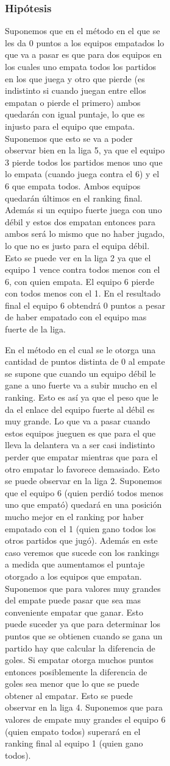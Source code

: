 \begin{figure}[h]
\begin{figure}[h]
\begin{figure}[h]
            \subsubsection*{Hipótesis}
            Suponemos que en el método en el que se les da 0 puntos a los equipos empatados lo que va a pasar es que para dos equipos en los cuales uno empata todos los partidos en los que juega y otro que pierde (es indistinto si cuando juegan entre ellos empatan o pierde el primero) ambos quedarán con igual puntaje, lo que es injusto para el equipo que empata. Suponemos que esto se va a poder observar bien en la liga 5, ya que el equipo 3 pierde todos los partidos menos uno que lo empata (cuando juega contra el 6) y el 6 que empata todos. Ambos equipos quedarán últimos en el ranking final. Además si un equipo fuerte juega con uno débil y estos dos empatan entonces para ambos será lo mismo que no haber jugado, lo que no es justo para el equipa débil. Esto se puede ver en la liga 2 ya que el equipo 1 vence contra todos menos con el 6, con quien empata. El equipo 6 pierde con todos menos con el 1. En el resultado final el equipo 6 obtendrá 0 puntos a pesar de haber empatado con el equipo mas fuerte de la liga.

            En el método en el cual se le otorga una cantidad de puntos distinta de 0 al empate se supone que cuando un equipo débil le gane a uno fuerte va a subir mucho en el ranking. Esto es así ya que el peso que le da el enlace del equipo fuerte al débil es muy grande. Lo que va a pasar cuando estos equipos jueguen es que para el que lleva la delantera va a ser casi indistinto perder que empatar mientras que para el otro empatar lo favorece demasiado. Esto se puede observar en la liga 2. Suponemos que el equipo 6 (quien perdió todos menos uno que empató) quedará en una posición mucho mejor en el ranking por haber empatado con el 1 (quien gano todos los otros partidos que jugó). Además en este caso veremos que sucede con los rankings a medida que aumentamos el puntaje otorgado a los equipos que empatan. Suponemos que para valores muy grandes del empate puede pasar que sea mas conveniente empatar que ganar. Esto puede suceder ya que para determinar los puntos que se obtienen cuando se gana un partido hay que calcular la diferencia de goles. Si empatar otorga muchos puntos entonces posiblemente la diferencia de goles sea menor que lo que se puede obtener al empatar. Esto se puede observar en la liga 4. Suponemos que para valores de empate muy grandes el equipo 6 (quien empato todos) superará en el ranking final al equipo 1 (quien gano todos).


\end{figure}
\end{figure}
\end{figure}
